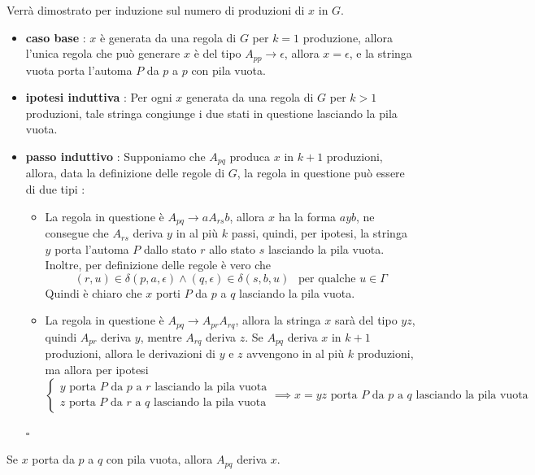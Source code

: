 \documentclass[10pt, letterpaper]{report}
\begin{document}
 Verrà dimostrato per induzione sul numero di produzioni di $x$ in $G$.\begin{itemize}
    \item \textbf{caso base} : $x$ è generata da una regola di $G$ per $k=1$ produzione, allora l'unica regola 
    che può generare $x$ è del tipo $A_{pp}\longrightarrow \epsilon$, allora $x=\epsilon$, e la stringa vuota porta 
    l'automa $P$ da $p$ a $p$ con pila vuota. 
    \item \textbf{ipotesi induttiva} : Per ogni $x$ generata da una regola di $G$ per $k>1$ produzioni, tale stringa 
    congiunge i due stati in questione lasciando la pila vuota. 
    \item \textbf{passo induttivo} : Supponiamo che $A_{pq}$ produca $x$ in $k+1$ produzioni, allora, data la definizione 
    delle regole di $G$, la regola in questione può essere di due tipi : \begin{itemize}
        \item La regola in questione è $A_{pq}\longrightarrow aA_{rs}b$, allora $x$ ha la forma $ayb$, ne consegue che 
        $A_{rs}$ deriva $y$ in al più $k$ passi, quindi, per ipotesi, la stringa $y$ porta l'automa $P$ dallo stato
        $r$ allo stato $s$ lasciando la pila vuota. Inoltre, per definizione delle regole è vero che 
        $$ (r,u)\in\delta(p,a,\epsilon)\land (q,\epsilon)\in\delta(s,b,u) \ \ \text{ per qualche }u\in\Gamma$$
        Quindi è chiaro che $x$ porti $P$ da $p$ a $q$ lasciando la pila vuota. 
        \item La regola in questione è $A_{pq}\longrightarrow A_{pr}A_{rq}$, allora la stringa $x$ sarà del tipo 
        $yz$, quindi $A_{pr}$ deriva $y$, mentre $A_{rq}$ deriva $z$. Se $A_{pq}$ deriva $x$ in $k+1$ produzioni, allora 
        le derivazioni di $y$ e $z$ avvengono in al più $k$ produzioni, ma allora per ipotesi$$\begin{cases}
            y\text{ porta $P$ da $p$ a $r$ lasciando la pila vuota}\\ 
            z\text{ porta $P$ da $r$ a $q$ lasciando la pila vuota}
        \end{cases}\implies x=yz\text{ porta $P$ da $p$ a $q$ lasciando la pila vuota} $$
    \end{itemize}
    \hfill $\square$
\end{itemize}
 Se $x$ porta da $p$ a $q$ con pila vuota, allora $A_{pq}$ deriva $x$.\acc
\end{document}
